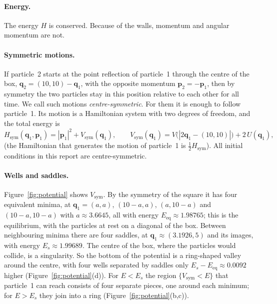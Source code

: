 \documentclass[11pt,a4paper]{article}
\newcommand{\q}{\mathbf{q}}
\newcommand{\p}{\mathbf{p}}
\newcommand{\Vs}{V_{\mathrm{sym}}}
\newcommand{\Eeq}{E_{\mathrm{eq}}}
\begin{document}
\paragraph{Energy.} The energy $H$ is conserved. Because of the walls,
momentum and angular momentum are not.

\paragraph{Symmetric motions.}
If particle~2 starts at the point reflection of particle~1 through the centre
of the box, $\q_2=(10,10)-\q_1$, with the opposite momentum $\p_2=-\p_1$, then
by symmetry the two particles stay in this position relative to each other for
all time. We call such motions \emph{centre-symmetric}. For them it is enough
to follow particle~1. Its motion is a Hamiltonian system with two degrees of
freedom, and the total energy is
\begin{equation}\label{eq:Hsym}
  H_{\mathrm{sym}}(\q_1,\p_1)=|\p_1|^2+\Vs(\q_1),\qquad
  \Vs(\q_1)=V\bigl(|2\q_1-(10,10)|\bigr)+2\,U(\q_1),
\end{equation}
(the Hamiltonian that generates the motion of particle~1 is
$\tfrac12H_{\mathrm{sym}}$). All initial conditions in this report are
centre-symmetric.

\paragraph{Wells and saddles.}
Figure~\ref{fig:potential} shows $\Vs$. By the symmetry of the square it has
four equivalent minima, at $\q_1=(a,a)$, $(10-a,a)$, $(a,10-a)$ and
$(10-a,10-a)$ with $a\approx3.6645$, all with energy
$\Eeq\approx1.98765$; this is the equilibrium, with the particles at rest on a
diagonal of the box. Between neighbouring minima there are four saddles, at
$\q_1\approx(3.1926,5)$ and its images, with energy $E_s\approx1.99689$. The
centre of the box, where the particles would collide, is a singularity. So the
bottom of the potential is a ring-shaped valley around the centre, with four
wells separated by saddles only $E_s-\Eeq\approx0.0092$ higher
(Figure~\ref{fig:potential}(d)). For $E<E_s$ the region $\{\Vs<E\}$ that
particle~1 can reach consists of four separate pieces, one around each
minimum; for $E>E_s$ they join into a ring (Figure~\ref{fig:potential}(b,c)).
\end{document}
